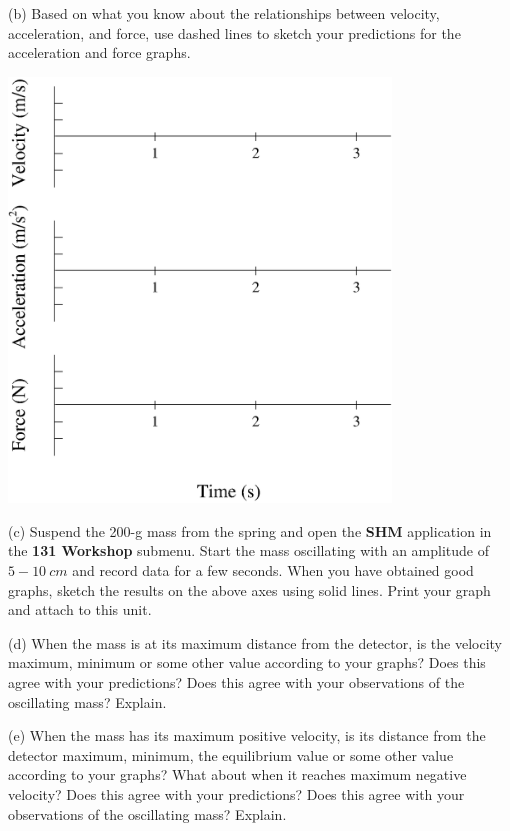 \newpage

(b) Based on what you know about the relationships between velocity, acceleration,
and force, use dashed lines to sketch your predictions for the acceleration
and force graphs.

\vspace{0.3cm}
{\par\centering \includegraphics[width=4.0in]{periodic_motion/periodic_motion_fig3b.eps} \par}
\vspace{0.3cm}

(c) Suspend the 200-g mass from the spring and 
open the \textbf{SHM} application in the \textbf{131 Workshop} submenu. 
Start the mass oscillating with an amplitude of $5-10~ cm$ and record data for a few seconds.
When you have obtained good graphs, sketch the results on the above axes using
solid lines. Print your graph and attach to this unit.

(d) When the mass is at its maximum distance from the detector, is the velocity
maximum, minimum or some other value according to your graphs? Does this agree
with your predictions? Does this agree with your observations of the oscillating
mass? Explain.
\vspace{15mm}

(e) When the mass has its maximum positive velocity, is its distance from the
detector maximum, minimum, the equilibrium value or some other value according
to your graphs? What about when it reaches maximum negative velocity? Does this
agree with your predictions? Does this agree with your observations of the oscillating mass? Explain. 
\vspace{20mm}

